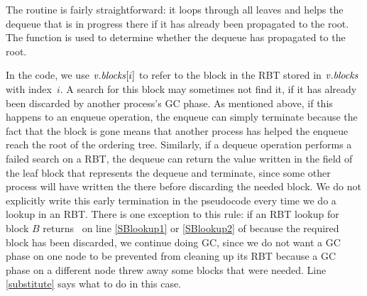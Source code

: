 The  routine is fairly straightforward:  it loops through all leaves and
helps the dequeue that is in progress there if it has already been propagated to the root.
The  function is used to determine whether the dequeue has propagated to the root.

In the code, we use $\mbox{\textnormal{\textit{v}}}.\mbox{\textit{blocks}}[i]$ to refer to the block in the RBT stored in $\mbox{\textnormal{\textit{v}}}.\mbox{\textit{blocks}}$
with index~$i$.
A search for this block may sometimes not find it, if it has already been discarded
by another process's GC phase.
As mentioned above, if this happens to an enqueue operation,
the enqueue can simply terminate because the fact that the block is gone means that another
process has helped the enqueue reach the root of the ordering tree.
Similarly, if  a dequeue operation performs a failed search on a RBT, the dequeue can return the value 
written in the  field of the 
leaf block that represents the dequeue and terminate, since some other process
will have written the  there before discarding the needed block.
We do not explicitly write this early termination in the pseudocode every time we do a lookup in an RBT.
There is one exception to this rule:  if an RBT lookup for block $B$ returns \nl\
on line \ref{SBlookup1} or \ref{SBlookup2} of
 because the required block has been discarded, 
we continue doing GC, since we do not want a GC phase on one node
to be prevented from cleaning up its RBT because a GC phase on a different node threw away some blocks
that were needed.
Line \ref{substitute} says what to do in this case.
